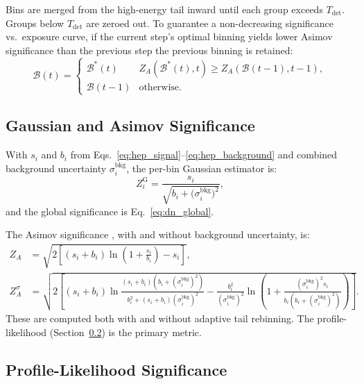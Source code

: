 \documentclass[12pt,a4paper]{article}
\newcommand{\si}{s_{i}}                  %
\newcommand{\bi}{b_{i}}                  %
\newcommand{\ZG}{Z^{\mathrm{G}}_{i}}
\begin{document}
Bins are merged from the high-energy tail inward until each group exceeds
$T_{\mathrm{det}}$.  Groups below $T_{\mathrm{det}}$ are zeroed out.
To guarantee a non-decreasing significance vs.\ exposure curve, if the
current step's optimal binning yields lower Asimov significance than the
previous step the previous binning is retained:
\begin{equation}
  \mathcal{B}(t) =
  \begin{cases}
    \mathcal{B}^*(t) & Z_A(\mathcal{B}^*(t),t) \ge Z_A(\mathcal{B}(t{-}1),t{-}1),\\
    \mathcal{B}(t-1) & \text{otherwise.}
  \end{cases}
  \label{eq:monotone_rebin}
\end{equation}

\subsection{Gaussian and Asimov Significance}
\label{sec:hep_gaussian_asimov}

With $\si$ and $\bi$ from Eqs.~\eqref{eq:hep_signal}--\eqref{eq:hep_background}
and combined background uncertainty $\sigma_i^{\mathrm{bkg}}$,
the per-bin Gaussian estimator is:
\begin{equation}
  \ZG = \frac{\si}{\sqrt{\bi + \bigl(\sigma_i^{\mathrm{bkg}}\bigr)^2}},
  \label{eq:hep_gaussian}
\end{equation}
and the global significance is Eq.~\eqref{eq:dn_global}.

The Asimov significance \cite{Cowan2010}, with and without background uncertainty, is:
\begin{align}
  Z_A &= \sqrt{2\left[(\si+\bi)\ln\!\left(1+\frac{\si}{\bi}\right) - \si\right]},
  \label{eq:asimov_simple}\\
  Z_A^{\sigma} &= \sqrt{2\left[
    (\si+\bi)\ln\!\frac{(\si+\bi)(\bi+(\sigma_i^{\mathrm{bkg}})^2)}
                       {\bi^2+(\si+\bi)(\sigma_i^{\mathrm{bkg}})^2}
    -\frac{\bi^2}{(\sigma_i^{\mathrm{bkg}})^2}
     \ln\!\left(1+\frac{(\sigma_i^{\mathrm{bkg}})^2 \si}{\bi(\bi+(\sigma_i^{\mathrm{bkg}})^2)}\right)
  \right]}.
  \label{eq:asimov_full}
\end{align}
These are computed both with and without adaptive tail rebinning.
The profile-likelihood (Section~\ref{sec:pl}) is the primary metric.

\subsection{Profile-Likelihood Significance}
\label{sec:pl}
\end{document}
